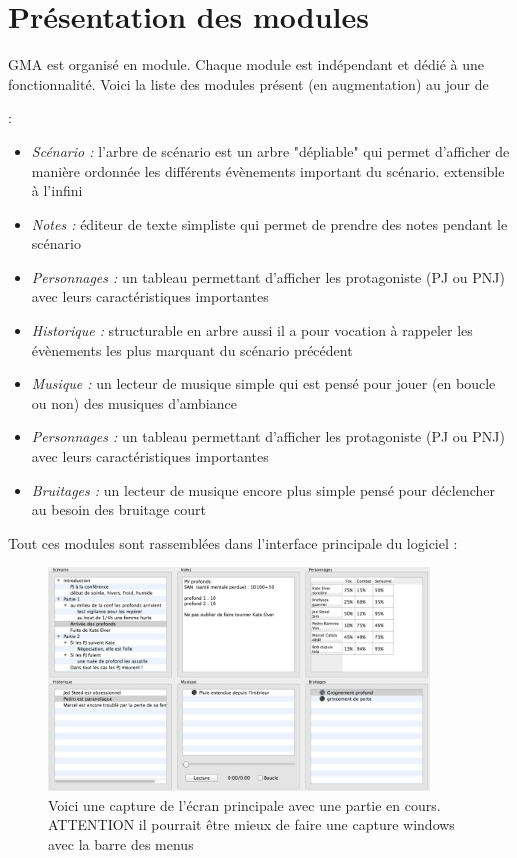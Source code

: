 \documentclass[12pt]{article}
\begin{document}
\section{Présentation des modules}\label{modules}
GMA est organisé en module. Chaque module est indépendant et dédié à une fonctionnalité. Voici la liste des modules présent (en augmentation) au jour de \date{\today} :
\begin{itemize}
    \item \emph{Scénario :} l'arbre de scénario est un arbre "dépliable" qui permet d'afficher de manière ordonnée les différents évènements important du scénario. extensible à l'infini
    \item \emph{Notes :} éditeur de texte simpliste qui permet de prendre des notes pendant le scénario
    \item \emph{Personnages :} un tableau permettant d'afficher les protagoniste (PJ ou PNJ) avec leurs caractéristiques importantes
    \item \emph{Historique :} structurable en arbre aussi il a pour vocation à rappeler les évènements les plus marquant du scénario précédent
    \item \emph{Musique :} un lecteur de musique simple qui est pensé pour jouer (en boucle ou non) des musiques d'ambiance
    \item \emph{Personnages :} un tableau permettant d'afficher les protagoniste (PJ ou PNJ) avec leurs caractéristiques importantes
    \item \emph{Bruitages :} un lecteur de musique encore plus simple pensé pour déclencher au besoin des bruitage court
\end{itemize}
Tout ces modules sont rassemblées dans l'interface principale du logiciel :
\begin{figure}[h]
    \includegraphics[width=0.9\textwidth]{screen_scenar_exemple}
    \caption{Voici une capture de l'écran principale avec une partie en cours.
    ATTENTION il pourrait être mieux de faire une capture windows avec la barre des menus}
\end{figure}
\end{document}
